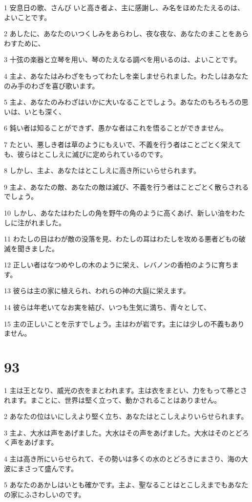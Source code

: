 \par 1 安息日の歌、さんび いと高き者よ、主に感謝し、み名をほめたたえるのは、よいことです。
\par 2 あしたに、あなたのいつくしみをあらわし、夜な夜な、あなたのまことをあらわすために、
\par 3 十弦の楽器と立琴を用い、琴のたえなる調べを用いるのは、よいことです。
\par 4 主よ、あなたはみわざをもってわたしを楽しませられました。わたしはあなたのみ手のわざを喜び歌います。
\par 5 主よ、あなたのみわざはいかに大いなることでしょう。あなたのもろもろの思いは、いとも深く、
\par 6 鈍い者は知ることができず、愚かな者はこれを悟ることができません。
\par 7 たとい、悪しき者は草のようにもえいで、不義を行う者はことごとく栄えても、彼らはとこしえに滅びに定められているのです。
\par 8 しかし、主よ、あなたはとこしえに高き所にいらせられます。
\par 9 主よ、あなたの敵、あなたの敵は滅び、不義を行う者はことごとく散らされるでしょう。
\par 10 しかし、あなたはわたしの角を野牛の角のように高くあげ、新しい油をわたしに注がれました。
\par 11 わたしの目はわが敵の没落を見、わたしの耳はわたしを攻める悪者どもの破滅を聞きました。
\par 12 正しい者はなつめやしの木のように栄え、レバノンの香柏のように育ちます。
\par 13 彼らは主の家に植えられ、われらの神の大庭に栄えます。
\par 14 彼らは年老いてなお実を結び、いつも生気に満ち、青々として、
\par 15 主の正しいことを示すでしょう。主はわが岩です。主には少しの不義もありません。

\chapter{93}

\par 1 主は王となり、威光の衣をまとわれます。主は衣をまとい、力をもって帯とされます。まことに、世界は堅く立って、動かされることはありません。
\par 2 あなたの位はいにしえより堅く立ち、あなたはとこしえよりいらせられます。
\par 3 主よ、大水は声をあげました。大水はその声をあげました。大水はそのとどろく声をあげます。
\par 4 主は高き所にいらせられて、その勢いは多くの水のとどろきにまさり、海の大波にまさって盛んです。
\par 5 あなたのあかしはいとも確かです。主よ、聖なることはとこしえまでもあなたの家にふさわしいのです。

